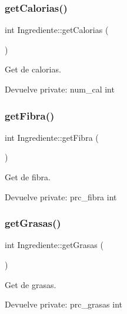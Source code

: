 \subsubsection{\texorpdfstring{get\+Calorias()}{getCalorias()}}
{\footnotesize\ttfamily int Ingrediente\+::get\+Calorias (\begin{DoxyParamCaption}{ }\end{DoxyParamCaption})}



Get de calorias. 

\begin{DoxyReturn}{Devuelve}
private\+: num\+\_\+cal int 
\end{DoxyReturn}
\mbox{\label{classIngrediente_a821f8c29400ef5059baf4f9d3fc536b5}} 
\subsubsection{\texorpdfstring{get\+Fibra()}{getFibra()}}
{\footnotesize\ttfamily int Ingrediente\+::get\+Fibra (\begin{DoxyParamCaption}{ }\end{DoxyParamCaption})}



Get de fibra. 

\begin{DoxyReturn}{Devuelve}
private\+: prc\+\_\+fibra int 
\end{DoxyReturn}
\mbox{\label{classIngrediente_af61e31d75a5d6a0c9b7325ada831f32e}} 
\subsubsection{\texorpdfstring{get\+Grasas()}{getGrasas()}}
{\footnotesize\ttfamily int Ingrediente\+::get\+Grasas (\begin{DoxyParamCaption}{ }\end{DoxyParamCaption})}



Get de grasas. 

\begin{DoxyReturn}{Devuelve}
private\+: prc\+\_\+grasas int 
\end{DoxyReturn}
\mbox{\label{classIngrediente_a411c8e40f95b5afb10b06cc334160fd8}} 
